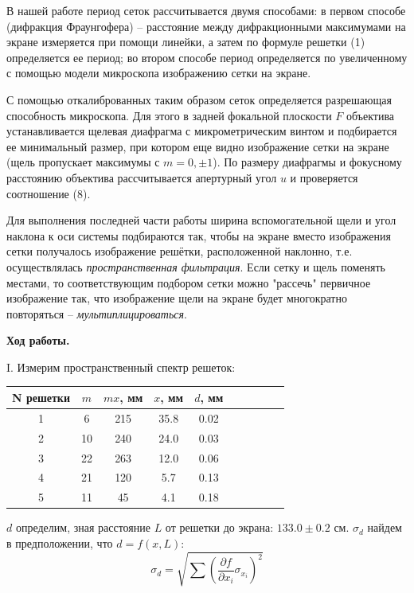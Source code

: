 \documentclass[14pt]{article}
\begin{document}
В нашей работе период сеток рассчитывается двумя способами: в первом способе (дифракция Фраунгофера) --
расстояние между дифракционными максимумами на экране измеряется при помощи линейки, а затем по формуле
решетки (1) определяется ее период; во втором способе период определяется по увеличенному с помощью модели
микроскопа изображению сетки на экране.

С помощью откалиброванных таким образом сеток определяется разрешающая способность микроскопа.
Для этого в задней фокальной плоскости $F$ объектива устанавливается щелевая диафрагма с микрометрическим
винтом и подбирается ее минимальный размер, при котором еще видно изображение сетки на экране (щель пропускает
максимумы с $m = 0, \pm 1$). По размеру диафрагмы и фокусному расстоянию объектива рассчитывается апертурный угол
$u$ и проверяется соотношение (8).

Для выполнения последней части работы ширина вспомогательной щели и угол наклона к оси системы подбираются так,
чтобы на экране вместо изображения сетки получалось изображение решётки, расположенной наклонно, т.е.
осуществлялась \textsl{пространственная фильтрация}. Если сетку
и щель поменять местами, то соответствующим подбором сетки можно "рассечь" первичное изображение так, что изображение щели
на экране будет многократно повторяться -- \textsl{мультиплицироваться}.

\vspace{1cm}
\textbf{Ход работы.}

\vspace{0.5cm}
I. Измерим пространственный спектр решеток:

\begin{center}
\begin{tabular}{|c|c|c|c|c|c|c|c|c|c|}
\hline
N решетки	&	$m$		&	$mx$, мм	&	$x$, мм	&	$d$, мм	\\
\hline
1			&	6		&	215			&	35.8	&	0.02	\\
\hline
2			&	10		&	240			&	24.0	&	0.03	\\
\hline
3			&	22		&	263			&	12.0	&	0.06	\\
\hline
4			&	21		&	120			&	5.7		&	0.13	\\
\hline
5			&	11		&	45			&	4.1		&	0.18	\\
\hline
\end{tabular}
\end{center}

$d$ определим, зная расстояние $L$ от решетки до экрана: $133.0 \pm 0.2$ см. $\sigma_d$ найдем в предположении, что $d = f(x, L)$:
$$
	\sigma_d = \sqrt{\sum \left(\frac{\partial f}{\partial x_i}\sigma_{x_i}\right)^2}
$$
\end{document}
